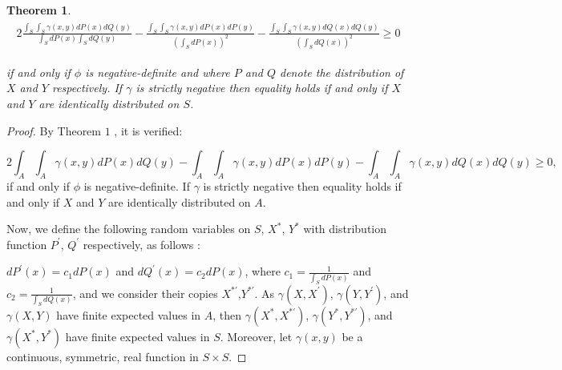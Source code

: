 \documentclass[11pt]{article}
\newtheorem{theorem}{Theorem}
\begin{document}
\begin{appendices}
\begin{theorem}
	\begin{gather}
	\begin{align*}
	2\frac{\int_S \int_S \gamma(x,y)dP(x) dQ(y)}{\int_{S}dP(x)\int_{S}dQ(y)}-	\frac{\int_S \int_S \gamma(x,y)dP(x) dP(y)}{(\int_{S}dP(x))^{2}}-\frac{\int_S \int_S \gamma(x,y)dQ(x) dQ(y)}{(\int_{S}dQ(x))^{2}}\geq 0
	\end{align*}
		\end{gather}
	
	if and only if $\phi$ is negative-definite and where $P$ and $Q$ denote the distribution of $X$ and $Y$ respectively. If $\gamma$ is strictly negative then equality holds if and only if $X$ and $Y$ are identically distributed on $S$.   
\end{theorem}

\begin{proof}
	
	By Theorem $1$ \cite{szekely2005new}, it is verified:
	
	
	\begin{equation}
	2\int_A \int_A \gamma(x,y)dP(x) dQ(y)-	\int_A	 \int_A \gamma(x,y)dP(x) dP(y)-\int_A \int_A \gamma(x,y)dQ(x) dQ(y)\geq 0,
	\end{equation}	
	if and only if $\phi$ is negative-definite. If $\gamma$ is strictly negative then equality holds if and only if $X$ and $Y$ are identically distributed on $A$.
	
	Now, we define the following random variables on $S$, $X^{*}$, $Y^{*}$ with distribution function $P^{\prime}$, $Q^{\prime}$ respectively, as follows :
	
	$dP^{\prime}(x)= c_1 dP(x)$ and $dQ^{\prime}(x)= c_2 dP(x)$, where $c_1= \frac{1}{\int_{S} dP(x)}$ and $c_2= {\frac{1}{\int_{S} dQ(x)}}$, 
	and we consider their copies $X^{*\prime}$,$Y^{*\prime}$.  As $\gamma(X,X^{\prime})$, $\gamma(Y,Y^{\prime})$, and $\gamma(X,Y)$ have finite expected values in $A$, then $\gamma(X^{*},X^{*\prime})$, $\gamma(Y^{*},Y^{*\prime})$, and $\gamma(X^{*},Y^{*})$ have finite expected values in $S$. Moreover, let $\gamma(x,y)$ be a continuous, symmetric, real function in  $S\times S$.
	
	
	

\end{proof}
\end{appendices}
\end{document}
